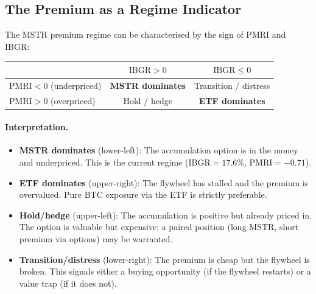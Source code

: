 \subsection{The Premium as a Regime Indicator}

\begin{corollary}\label{cor:regime-map}
The MSTR premium regime can be characterised by the sign of PMRI and IBGR:
\begin{center}
\begin{tabular}{@{}lcc@{}}
\toprule
& $\mathrm{IBGR} > 0$ & $\mathrm{IBGR} \le 0$ \\
\midrule
$\mathrm{PMRI} < 0$ (underpriced)
  & \textbf{MSTR dominates} & Transition / distress \\
$\mathrm{PMRI} > 0$ (overpriced)
  & Hold / hedge & \textbf{ETF dominates} \\
\bottomrule
\end{tabular}
\end{center}
\end{corollary}

\paragraph{Interpretation.}
\begin{itemize}
  \item \textbf{MSTR dominates} (lower-left): The accumulation option is
    in the money and underpriced.  This is the current regime
    ($\mathrm{IBGR} = 17.6\%$, $\mathrm{PMRI} = -0.71$).

  \item \textbf{ETF dominates} (upper-right): The flywheel has stalled
    and the premium is overvalued.  Pure BTC exposure via the ETF is
    strictly preferable.

  \item \textbf{Hold/hedge} (upper-left): The accumulation is positive
    but already priced in.  The option is valuable but expensive; a
    paired position (long MSTR, short premium via options) may be
    warranted.

  \item \textbf{Transition/distress} (lower-right): The premium is
    cheap but the flywheel is broken.  This signals either a buying
    opportunity (if the flywheel restarts) or a value trap (if it
    does not).
\end{itemize}

